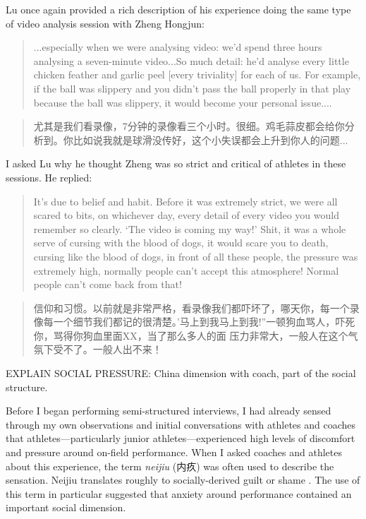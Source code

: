 \begin{CJK}{UTF8}{gbsn}
Lu once again provided a rich description of his experience doing the same type of video analysis session with Zheng Hongjun:

\begin{quote}
  ...especially when we were analysing video: we'd spend three hours analysing a seven-minute video...So much detail: he'd analyse every little chicken feather and garlic peel [every triviality] for each of us. For example, if the ball was slippery and you didn't pass the ball properly in that play because the ball was slippery, it would become your personal issue....
\end{quote}

\begin{quote}
    尤其是我们看录像，7分钟的录像看三个小时。很细。鸡毛蒜皮都会给你分析到。你比如说我就是球滑没传好，这个小失误都会上升到你人的问题...
\end{quote}


I asked Lu why he thought Zheng was so strict and critical of athletes in these sessions.  He replied:

\begin{quote}
    It's due to belief and habit. Before it was extremely strict, we were all scared to bits, on whichever day, every detail of every video you would remember so clearly. `The video is coming my way!'  Shit, it was a whole serve of cursing with the blood of dogs, it would scare you to death, cursing like the blood of dogs, in front of all these people, the pressure was extremely high, normally people can’t accept this atmosphere! Normal people can’t come back from that!
\end{quote}

  \begin{quote}
      信仰和习惯。以前就是非常严格，看录像我们都吓坏了，哪天你，每一个录像每一个细节我们都记的很清楚。'马上到我马上到我!''一顿狗血骂人，吓死你，骂得你狗血里面XX，当了那么多人的面 压力非常大，一般人在这个气氛下受不了。一般人出不来！
  \end{quote}


EXPLAIN SOCIAL PRESSURE:
China dimension with coach, part of the social structure.


Before I began performing semi-structured interviews, I had already sensed through my own observations and initial conversations with athletes and coaches that athletes---particularly junior athletes---experienced high levels of discomfort and pressure around on-field performance. When I asked coaches and athletes about this experience, the term \textit{neijiu} (内疚) was often used to describe the sensation.  Neijiu translates roughly to socially-derived guilt or shame \citep{Pleco2018}.  The use of this term in particular suggested that anxiety around performance contained an important social dimension.


\end{CJK}
